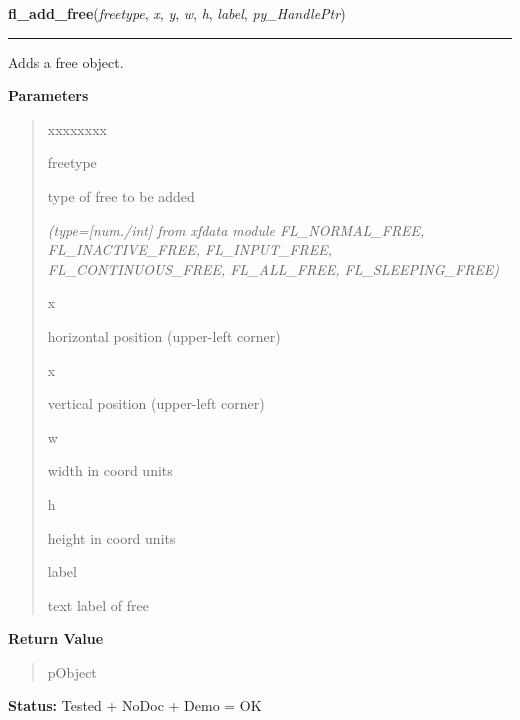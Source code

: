 \hspace{.8\funcindent}\begin{boxedminipage}{\funcwidth}

    \raggedright \textbf{fl\_add\_free}(\textit{freetype}, \textit{x}, \textit{y}, \textit{w}, \textit{h}, \textit{label}, \textit{py\_HandlePtr})

    \vspace{-1.5ex}

    \rule{\textwidth}{0.5\fboxrule}
\setlength{\parskip}{2ex}
    Adds a free object.

\setlength{\parskip}{1ex}
      \textbf{Parameters}
      \vspace{-1ex}

      \begin{quote}
        \begin{Ventry}{xxxxxxxx}

          \item[freetype]

          type of free to be added

            {\it (type=[num./int] from xfdata module FL\_NORMAL\_FREE, FL\_INACTIVE\_FREE, 
FL\_INPUT\_FREE, FL\_CONTINUOUS\_FREE, FL\_ALL\_FREE, FL\_SLEEPING\_FREE)}

          \item[x]

          horizontal position (upper-left corner)

          \item[x]

          vertical position (upper-left corner)

          \item[w]

          width in coord units

          \item[h]

          height in coord units

          \item[label]

          text label of free

        \end{Ventry}

      \end{quote}

      \textbf{Return Value}
    \vspace{-1ex}

      \begin{quote}
      pObject

      \end{quote}

\textbf{Status:} Tested + NoDoc + Demo = OK



    \end{boxedminipage}

